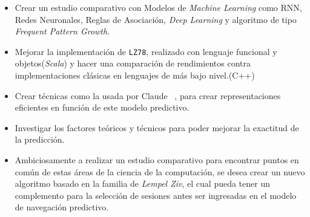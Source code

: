 \begin{itemize}

\item Crear un estudio comparativo con Modelos de \emph{Machine Learning} como RNN, Redes Neuronales, Reglas de Asociación, \emph{Deep Learning} y algoritmo de tipo \emph{Frequent Pattern Growth}.

\item Mejorar la implementación de \texttt{LZ78}, realizado con lenguaje funcional y objetos(\emph{Scala}) y hacer una comparación de rendimientos contra implementaciones clásicas en lenguajes de más bajo nivel.(C++)


\item Crear técnicas como la usada por Claude \etal~\cite{Claude2014}, para crear representaciones eficientes en función de este modelo predictivo.


\item Investigar los factores teóricos y técnicos para poder mejorar la exactitud de la predicción.

\item Ambiciosamente a realizar un estudio comparativo para encontrar puntos en común de estas áreas de la ciencia de la computación, se desea crear un nuevo algoritmo basado en la familia de \emph{Lempel Ziv}, el cual pueda tener un complemento para la selección de sesiones antes ser ingresadas en el modelo de navegación predictivo. 


	
\end{itemize}	






 








